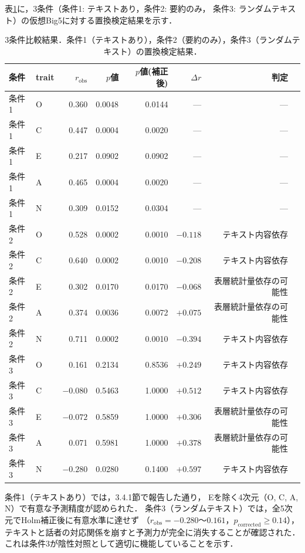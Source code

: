 \documentclass[dvipdfmx,11pt,a4paper]{bxjsarticle}
\renewcommand{\_}{\paperorigunderscore\allowbreak}%
\begin{document}
表\ref{tab:baseline_comparison}に，3条件（条件1: テキストあり，条件2: 要約のみ，
条件3: ランダムテキスト）の仮想Big5に対する置換検定結果を示す．

\begin{table}[htbp]
\centering
\caption{3条件比較結果．条件1（テキストあり），条件2（要約のみ），条件3（ランダムテキスト）の置換検定結果．}
\label{tab:baseline_comparison}
\begin{tabular}{llrrrrrl}
\toprule
条件 & trait & $r_{\text{obs}}$ & $p$値 & $p$値(補正後) & $\Delta r$ & 判定 \\
\midrule
条件1 & O & 0.360 & 0.0048 & 0.0144 & --- & --- \\
条件1 & C & 0.447 & 0.0004 & 0.0020 & --- & --- \\
条件1 & E & 0.217 & 0.0902 & 0.0902 & --- & --- \\
条件1 & A & 0.465 & 0.0004 & 0.0020 & --- & --- \\
条件1 & N & 0.309 & 0.0152 & 0.0304 & --- & --- \\
\midrule
条件2 & O & 0.528 & 0.0002 & 0.0010 & $-0.118$ & テキスト内容依存 \\
条件2 & C & 0.640 & 0.0002 & 0.0010 & $-0.208$ & テキスト内容依存 \\
条件2 & E & 0.302 & 0.0170 & 0.0170 & $-0.068$ & 表層統計量依存の可能性 \\
条件2 & A & 0.374 & 0.0036 & 0.0072 & $+0.075$ & 表層統計量依存の可能性 \\
条件2 & N & 0.711 & 0.0002 & 0.0010 & $-0.394$ & テキスト内容依存 \\
\midrule
条件3 & O & 0.161 & 0.2134 & 0.8536 & $+0.249$ & テキスト内容依存 \\
条件3 & C & $-0.080$ & 0.5463 & 1.0000 & $+0.512$ & テキスト内容依存 \\
条件3 & E & $-0.072$ & 0.5859 & 1.0000 & $+0.306$ & 表層統計量依存の可能性 \\
条件3 & A & 0.071 & 0.5981 & 1.0000 & $+0.378$ & 表層統計量依存の可能性 \\
条件3 & N & $-0.280$ & 0.0280 & 0.1400 & $+0.597$ & テキスト内容依存 \\
\bottomrule
\end{tabular}
\end{table}

条件1（テキストあり）では，3.4.1節で報告した通り，
Eを除く4次元（O, C, A, N）で有意な予測精度が認められた．
条件3（ランダムテキスト）では，全5次元でHolm補正後に有意水準に達せず
（$r_{\text{obs}} = -0.280$〜$0.161$，$p_{\text{corrected}} \geq 0.14$），
テキストと話者の対応関係を崩すと予測力が完全に消失することが確認された．
これは条件3が陰性対照として適切に機能していることを示す．
\end{document}
